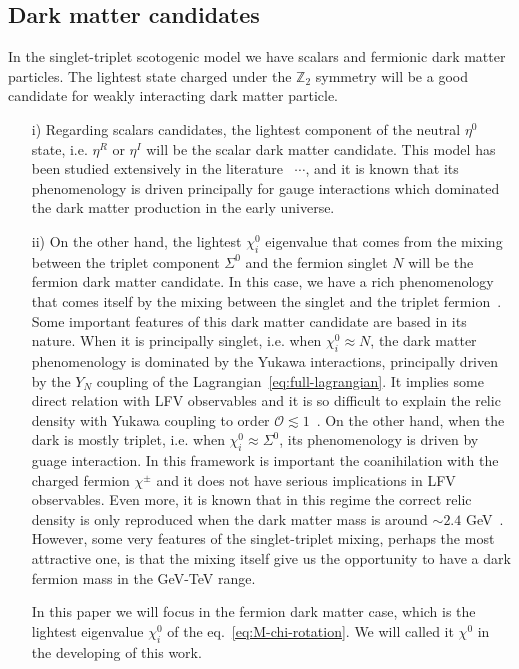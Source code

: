 \documentclass[12pt,letterpaper]{article}
\begin{document}
\subsection{Dark matter candidates}
\label{sec:dark-matter}

In the singlet-triplet scotogenic model we have scalars and fermionic dark matter particles. The lightest state charged under the $\mathbb{Z}_2$ symmetry will be a good candidate for weakly interacting dark matter particle. 
\begin{enumerate}
\item[i)] Regarding scalars candidates, the lightest component of the neutral $\eta^0$ state, i.e. $\eta^R$ or $\eta^I$ will be the scalar dark matter candidate. 
This model has been studied extensively in the literature~\cite{Deshpande:1977rw} $\cdots$, and it is known that its phenomenology is driven principally for gauge interactions which dominated the dark matter production in the early universe. 
%
\item[ii)] On the other hand, the lightest $\chi_i^0$ eigenvalue that comes from the mixing between the triplet component $\Sigma^0$ and the fermion singlet $N$ will be the fermion dark matter candidate. In this case, we have a rich phenomenology that comes itself by the mixing between the singlet and the triplet fermion~\cite{Hirsch:2013ola, Rocha-Moran:2016enp, Merle:2016scw}.
Some important features of this dark matter candidate are based in its nature. When it is principally singlet, i.e. when $\chi_i^0\approx N$, the dark matter phenomenology is dominated by the Yukawa interactions, principally driven by the $Y_N$ coupling of the Lagrangian~\ref{eq:full-lagrangian}. It implies some direct relation with LFV observables and it is so difficult to explain the relic density with Yukawa coupling to order $\mathcal{O}\lesssim 1$~\cite{Ibarra:2016dlb}. 
On the other hand, when the dark is mostly triplet, i.e. when $\chi_i^0\approx \Sigma^0$, its phenomenology is driven by guage interaction. In this framework is important the coanihilation with the charged fermion $\chi^{\pm}$ and it does not have serious implications in LFV observables. Even more, it is known that in this regime the correct relic density is only reproduced when the dark matter mass is around $\sim 2.4$ GeV~\cite{Ma:2008cu}. However, some very features of the singlet-triplet mixing, perhaps the most attractive one, is that the mixing itself give us the opportunity to have a dark fermion mass in the GeV-TeV range.   

In this paper we will focus in the fermion dark matter case, which is the lightest eigenvalue $\chi_i^0$ of the eq.~\ref{eq:M-chi-rotation}. We will called it $\chi^0$ in the developing of this work. 
\end{enumerate}
\end{document}

